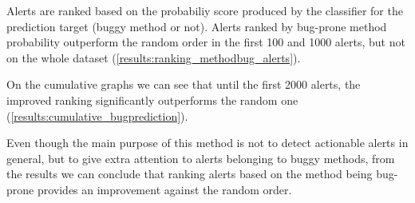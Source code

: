Alerts are ranked based on the probabiliy score produced by the classifier for the prediction target (buggy method or not). Alerts ranked by bug-prone method probability outperform the random order in the first 100 and 1000 alerts, but not on the whole dataset (\cref{results:ranking_methodbug_alerts}).

On the cumulative graphs we can see that until the first 2000 alerts, the improved ranking significantly outperforms the random one (\cref{results:cumulative_bugprediction}).

Even though the main purpose of this method is not to detect actionable alerts in general, but to give extra attention to alerts belonging to buggy methods, from the results we can conclude that ranking alerts based on the method being bug-prone provides an improvement against the random order.

